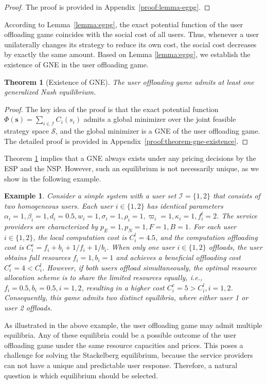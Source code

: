 \documentclass[lettersize,journal]{IEEEtran}
\newtheorem{theorem}{Theorem}
\newtheorem{example}{Example}
\begin{document}
\begin{proof}
    The proof is provided in Appendix~\ref{proof:lemma-egpg}.
\end{proof}
According to Lemma~\ref{lemma:egpg}, the exact potential function of the user offloading game coincides with the social cost of all users. Thus, whenever a user unilaterally changes its strategy to reduce its own cost, the social cost decreases by exactly the same amount.
Based on Lemma \ref{lemma:egpg}, we establish the existence of GNE in the user offloading game. 
\begin{theorem}[Existence of GNE]\label{theorem:gne-existence}
    The user offloading game admits at least one generalized Nash equilibrium.
\end{theorem}
\begin{proof}
    The key idea of the proof is that the exact potential function $\Phi(\boldsymbol{s})=\sum_{i\in\mathcal{I}}C_i(s_i)$ admits a global minimizer over the joint feasible strategy space $\mathcal{S}$, and the global minimizer is a GNE of the user offloading game.
    The detailed proof is provided in Appendix~\ref{proof:theorem-gne-existence}.
\end{proof}
Theorem \ref{theorem:gne-existence} implies that a GNE always exists under any pricing decisions by the ESP and the NSP. However, such an equilibrium is not necessarily unique, as we show in the following example.

\begin{example}
   Consider a simple system with a user set $\mathcal{I}=\{1,2\}$ that consists of two homogeneous users. Each user $i\in\{1,2\}$ has identical parameters $\alpha_i=1,\beta_i=1,d_i=0.5,w_i=1,\sigma_i=1,\rho_i=1,\varpi_i=1,\kappa_i=1,f^l_i=2$. The service providers are characterized by $p_E=1, p_N=1,F=1,B=1$. For each user $i\in\{1,2\}$, the local computation cost is $C^l_i=4.5$, and the computation offloading cost is $C^e_i=f_i+b_i+1/f_i+1/b_i$. When only one user $i\in\{1,2\}$ offloads, the user obtains full resources $f_i=1,b_i=1$ and achieves a beneficial offloading cost $C^e_i=4<C^l_i$. However, if both users offload simultaneously, the optimal resource allocation scheme is to share the limited resources equally, i.e., $f_i=0.5,b_i=0.5,i=1,2$, resulting in a higher cost $C^e_i=5>C^l_i,i=1,2$. Consequently, this game admits two distinct equilibria, where either user 1 or user 2 offloads.
\end{example}

As illustrated in the above example, the user offloading game may admit multiple equilibria. Any of these equilibria could be a possible outcome of the user offloading game under the same resource capacities and prices. 
This poses a challenge for solving the Stackelberg equilibrium, because the service providers can not have a unique and predictable user response. Therefore, a natural question is which equilibrium should be selected.
\end{document}
